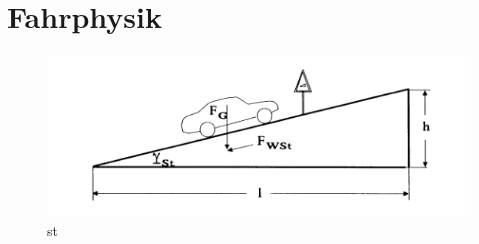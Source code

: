 \section{Fahrphysik}
\begin{figure}[H]
    \centering
    \includegraphics[width = .8 \linewidth]{Graphics/St.png}
    \caption{st\cite{white1972determination}}
\end{figure}